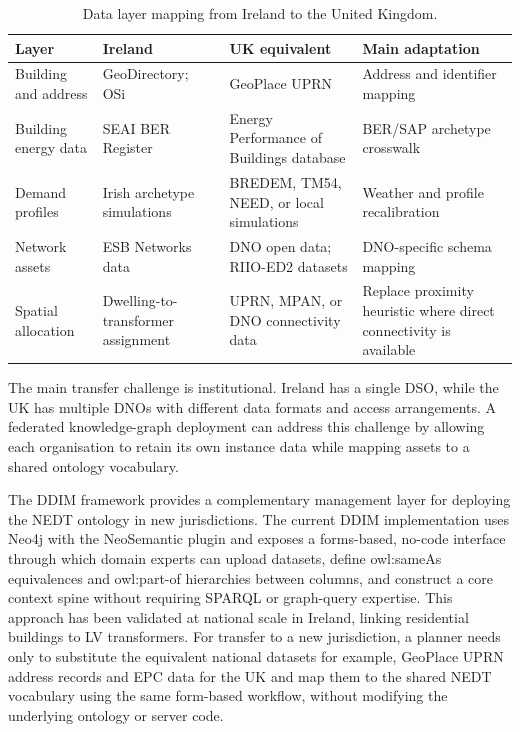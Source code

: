 \documentclass[preprint,12pt]{elsarticle}
\begin{document}
\begin{table}[H]
\centering
\caption{Data layer mapping from Ireland to the United Kingdom.}
\label{tab:jurisdiction_mapping}
\scriptsize
\begin{tabularx}{\textwidth}{P{2.5cm}YYY}
\toprule
\textbf{Layer} & \textbf{Ireland} & \textbf{UK equivalent} &
  \textbf{Main adaptation} \\
\midrule
Building and address &
  GeoDirectory; OSi &
  GeoPlace UPRN &
  Address and identifier mapping \\
Building energy data &
  SEAI BER Register &
  Energy Performance of Buildings database &
  BER/SAP archetype crosswalk \\
Demand profiles &
  Irish archetype simulations &
  BREDEM, TM54, NEED, or local simulations &
  Weather and profile recalibration \\
Network assets &
  ESB Networks data &
  DNO open data; RIIO-ED2 datasets &
  DNO-specific schema mapping \\
Spatial allocation &
  Dwelling-to-transformer assignment &
  UPRN, MPAN, or DNO connectivity data &
  Replace proximity heuristic where direct connectivity is available \\
\bottomrule
\end{tabularx}
\end{table}

The main transfer challenge is institutional.
Ireland has a single DSO, while the UK has multiple DNOs with different
data formats and access arrangements.
A federated knowledge-graph deployment can address this challenge by
allowing each organisation to retain its own instance data while mapping
assets to a shared ontology vocabulary.

The DDIM framework provides a complementary management layer for deploying the NEDT ontology in new jurisdictions. The current DDIM implementation uses Neo4j with the NeoSemantic plugin and exposes a forms-based, no-code interface through which domain experts can upload datasets, define owl:sameAs equivalences and owl:part-of hierarchies between columns, and construct a core context spine without requiring SPARQL or graph-query expertise. This approach has been validated at national scale in Ireland, linking residential buildings to LV transformers. For transfer to a new jurisdiction, a planner needs only to substitute the equivalent national datasets for example, GeoPlace UPRN address records and EPC data for the UK and map them to the shared NEDT vocabulary using the same form-based workflow, without modifying the underlying ontology or server code.
\end{document}
